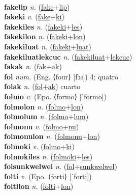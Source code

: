  \label{fakelon} \\
\textbf{fakelip} \textit{n.} (\hyperref[fake]{fake}+\hyperref[lip]{lip})
 \label{fakelip} \\
\textbf{fakeki} \textit{v.} (\hyperref[fake]{fake}+\hyperref[ki]{ki})
 \label{fakeki} \\
\textbf{fakekiles} \textit{n.} (\hyperref[fakeki]{fakeki}+\hyperref[les]{les})
 \label{fakekiles} \\
\textbf{fakekilon} \textit{n.} (\hyperref[fakeki]{fakeki}+\hyperref[lon]{lon})
 \label{fakekilon} \\
\textbf{fakekiluat} \textit{n.} (\hyperref[fakeki]{fakeki}+\hyperref[luat]{luat})
 \label{fakekiluat} \\
\textbf{fakekiluatlekcuc} \textit{n.} (\hyperref[fakekiluat]{fakekiluat}+\hyperref[lekcuc]{lekcuc})
 \label{fakekiluatlekcuc} \\
\textbf{fakak} \textit{n.} (\hyperref[fak]{fak}+\hyperref[ak]{ak})
 \label{fakak} \\
\textbf{fol} \textit{num.} (Eng. ⟨four⟩ [fɔɹ])
4; quatro \label{fol} \\
\textbf{folak} \textit{n.} (\hyperref[fol]{fol}+\hyperref[ak]{ak})
cuarto \label{folak} \\
\textbf{folmo} \textit{v.} (Epo. ⟨formo⟩ [ˈformo])
 \label{folmo} \\
\textbf{folmolon} \textit{n.} (\hyperref[folmo]{folmo}+\hyperref[lon]{lon})
 \label{folmolon} \\
\textbf{folmolum} \textit{n.} (\hyperref[folmo]{folmo}+\hyperref[lum]{lum})
 \label{folmolum} \\
\textbf{folmonu} \textit{v.} (\hyperref[folmo]{folmo}+\hyperref[nu]{nu})
 \label{folmonu} \\
\textbf{folmonulon} \textit{n.} (\hyperref[folmonu]{folmonu}+\hyperref[lon]{lon})
 \label{folmonulon} \\
\textbf{folmoki} \textit{v.} (\hyperref[folmo]{folmo}+\hyperref[ki]{ki})
 \label{folmoki} \\
\textbf{folmokiles} \textit{n.} (\hyperref[folmoki]{folmoki}+\hyperref[les]{les})
 \label{folmokiles} \\
\textbf{folsunkwelwel} \textit{n.} (\hyperref[fol]{fol}+\hyperref[sunkwelwel]{sunkwelwel})
 \label{folsunkwelwel} \\
\textbf{folti} \textit{v.} (Epo. ⟨forti⟩ [ˈforti])
 \label{folti} \\
\textbf{foltilon} \textit{n.} (\hyperref[folti]{folti}+\hyperref[lon]{lon})
 \label{foltilon} \\
